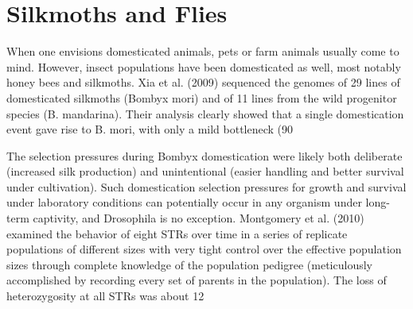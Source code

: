 \documentclass{article}
\begin{document}
\section{Silkmoths and Flies}
When one envisions domesticated animals, pets or farm animals usually come to mind. However, insect populations have been domesticated as well, most notably honey bees and silkmoths. Xia et al. (2009) sequenced the genomes of 29 lines of domesticated silkmoths (Bombyx mori) and of 11 lines from the wild progenitor species (B. mandarina). Their analysis clearly showed that a single domestication event gave rise to B. mori, with only a mild bottleneck (90%

The selection pressures during Bombyx domestication were likely both deliberate (increased silk production) and unintentional (easier handling and better survival under cultivation). Such domestication selection pressures for growth and survival under laboratory conditions can potentially occur in any organism under long-term captivity, and Drosophila is no exception. Montgomery et al. (2010) examined the behavior of eight STRs over time in a series of replicate populations of different sizes with very tight control over the effective population sizes through complete knowledge of the population pedigree (meticulously accomplished by recording every set of parents in the population). The loss of heterozygosity at all STRs was about 12%
\end{document}
